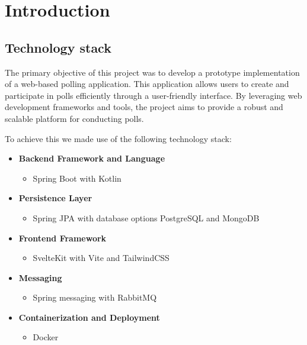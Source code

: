 \section{Introduction}
\label{sec:introduction}


\subsection{Technology stack}
The primary objective of this project was to develop a prototype implementation of a web-based polling application.
This application allows users to create and participate in polls efficiently through a user-friendly interface. 
By leveraging web development frameworks and tools, the project aims to provide a robust and scalable platform for conducting polls.

To achieve this we made use of the following technology stack:

\begin{itemize}
    \item \textbf{Backend Framework and Language}
    \begin{itemize}
        \item Spring Boot with Kotlin
    \end{itemize}

    \item \textbf{Persistence Layer}
    \begin{itemize}
        \item Spring JPA  with database options PostgreSQL and MongoDB
    \end{itemize}

    \item \textbf{Frontend Framework}
    \begin{itemize}
        \item SvelteKit with Vite and TailwindCSS
    \end{itemize}

    \item \textbf{Messaging}
    \begin{itemize}
        \item Spring messaging with RabbitMQ
    \end{itemize}

    \item \textbf{Containerization and Deployment}
    \begin{itemize}
        \item Docker
    \end{itemize}
\end{itemize}


